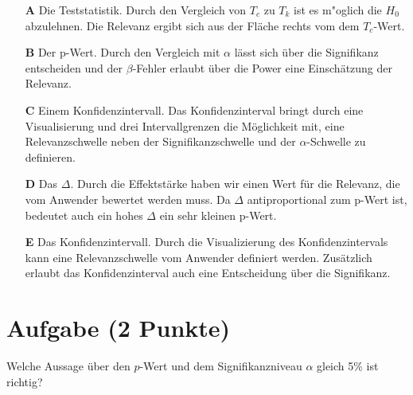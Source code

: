 \documentclass[a4paper, 9pt]{scrartcl}\usepackage[]{graphicx}\usepackage[]{xcolor}
\begin{document}
\begin{enumerate}
\item [\textbf{A} \msquare] Die Teststatistik. Durch den Vergleich von $T_c$ zu $T_k$ ist es m{"o}glich die $H_0$ abzulehnen. Die Relevanz ergibt sich aus der Fläche rechts vom dem $T_c$-Wert.
\item [\textbf{B} \msquare] Der p-Wert. Durch den Vergleich mit $\alpha$ lässt sich über die Signifikanz entscheiden und der $\beta$-Fehler erlaubt über die Power eine Einschätzung der Relevanz.
\item [\textbf{C} \msquare] Einem Konfidenzintervall. Das Konfidenzinterval bringt durch eine Visualisierung und drei Intervallgrenzen die Möglichkeit mit, eine Relevanzschwelle neben der Signifikanzschwelle und der $\alpha$-Schwelle zu definieren.
\item [\textbf{D} \msquare] Das $\Delta$. Durch die Effektstärke haben wir einen Wert für die Relevanz, die vom Anwender bewertet werden muss. Da $\Delta$ antiproportional zum p-Wert ist, bedeutet auch ein hohes $\Delta$ ein sehr kleinen p-Wert.
\item [\textbf{E} \msquare] Das Konfidenzintervall. Durch die Visualizierung des Konfidenzintervals kann eine Relevanzschwelle vom Anwender definiert werden. Zusätzlich erlaubt das Konfidenzinterval auch eine Entscheidung über die Signifikanz.
\end{enumerate}

\section{Aufgabe \hfill (2 Punkte)}



Welche Aussage über den $p$-Wert und dem Signifikanzniveau $\alpha$ gleich 5\% ist richtig?
\end{document}
